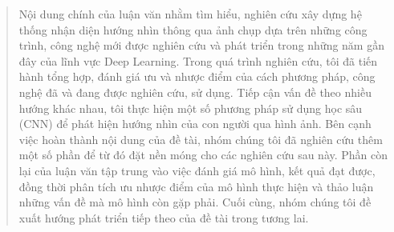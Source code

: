 \documentclass[12pt,a4paper,oneside]{book} %
\begin{document}
\begin{abstract}
	Nội dung chính của luận văn nhằm tìm hiểu, nghiên cứu xây dựng hệ thống nhận diện hướng nhìn thông qua ảnh chụp dựa trên những công trình, công nghệ mới được nghiên cứu và phát triển trong những năm gần đây của lĩnh vực Deep Learning. Trong quá trình nghiên cứu, tôi đã  tiến hành tổng hợp, đánh giá ưu và nhược điểm của cách phương pháp, công nghệ đã và đang được nghiên cứu, sử dụng. Tiếp cận vấn đề theo nhiều hướng khác nhau, tôi thực hiện một số phương pháp sử dụng học sâu (CNN) để phát hiện hướng nhìn của con người qua hình ảnh. Bên cạnh việc hoàn thành nội dung của đề tài, nhóm chúng tôi đã nghiên cứu thêm một số phần để từ đó đặt nền móng cho các nghiên cứu sau này. Phần còn lại của luận văn tập trung vào việc đánh giá mô hình, kết quả đạt được, đồng thời phân tích ưu nhược điểm của mô hình thực hiện và thảo luận những vấn đề mà mô hình còn gặp phải. Cuối cùng, nhóm chúng tôi đề xuất hướng phát triển tiếp theo của đề tài trong tương lai.
\end{abstract}	


\tableofcontents
\listoffigures


\mainmatter

\fancyhead{}  %
\renewcommand{\footrulewidth}{0.4pt}

\pagestyle{fancy}  %
%






\end{document}
